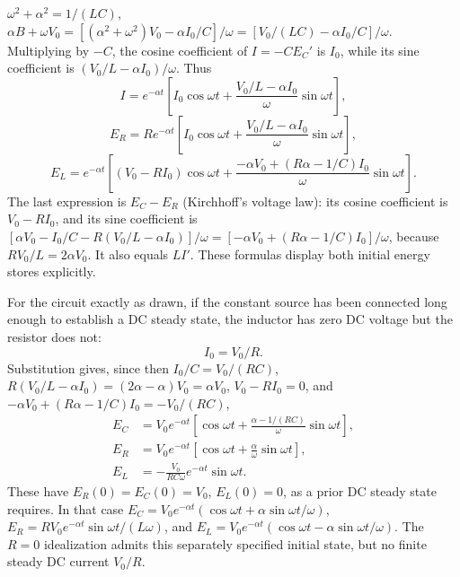 $\omega^2+\alpha^2=1/(LC)$,
$\alpha B+\omega V_0=[(\alpha^2+\omega^2)V_0-\alpha I_0/C]/\omega
=[V_0/(LC)-\alpha I_0/C]/\omega$. Multiplying by $-C$, the
cosine coefficient of $I=-C E_C'$ is $I_0$, while its sine
coefficient is $(V_0/L-\alpha I_0)/\omega$. Thus
\[
I=e^{-\alpha t}\left[I_0\cos\omega t+
\frac{V_0/L-\alpha I_0}{\omega}\sin\omega t\right],
\]
\[
\boxed{E_R=Re^{-\alpha t}\left[I_0\cos\omega t+
\frac{V_0/L-\alpha I_0}{\omega}\sin\omega t\right]},
\]
\[
\boxed{E_L=e^{-\alpha t}\left[(V_0-RI_0)\cos\omega t+
\frac{-\alpha V_0+(R\alpha-1/C)I_0}{\omega}\sin\omega t\right]}.
\]
The last expression is $E_C-E_R$ (Kirchhoff's voltage law):
its cosine coefficient is $V_0-RI_0$, and its sine coefficient
is $[\alpha V_0-I_0/C-R(V_0/L-\alpha I_0)]/\omega
=[-\alpha V_0+(R\alpha-1/C)I_0]/\omega$, because
$RV_0/L=2\alpha V_0$. It also equals $LI'$.
These formulas display both initial energy stores explicitly.

For the circuit exactly as drawn, if the constant source has
been connected long enough to establish a DC steady state,
the inductor has zero DC voltage but the resistor does not:
\[
\boxed{I_0=V_0/R}.
\]
Substitution gives, since then $I_0/C=V_0/(RC)$,
$R(V_0/L-\alpha I_0)=(2\alpha-\alpha)V_0=\alpha V_0$,
$V_0-RI_0=0$, and
$-\alpha V_0+(R\alpha-1/C)I_0=-V_0/(RC)$,
\begin{align*}
E_C&=V_0e^{-\alpha t}\left[
\cos\omega t+\frac{\alpha-1/(RC)}{\omega}\sin\omega t\right],\\
E_R&=V_0e^{-\alpha t}\left[
\cos\omega t+\frac\alpha\omega\sin\omega t\right],\\
E_L&=-\frac{V_0}{RC\omega}e^{-\alpha t}\sin\omega t.
\end{align*}
These have $E_R(0)=E_C(0)=V_0$, $E_L(0)=0$, as a prior
DC steady state requires.
In that case $E_C=V_0e^{-\alpha t}(\cos\omega t+
\alpha\sin\omega t/\omega)$,
$E_R=RV_0e^{-\alpha t}\sin\omega t/(L\omega)$, and
$E_L=V_0e^{-\alpha t}(\cos\omega t-
\alpha\sin\omega t/\omega)$.
The $R=0$ idealization admits this separately specified initial
state, but no finite steady DC current $V_0/R$.


